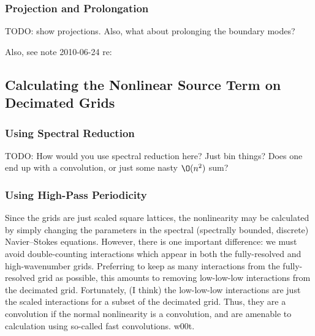\documentclass[10pt,showpacs,showkeys,%
amsfonts,amsmath,
onecolumn,
floatfix,aps,superscriptaddress]{revtex4}
\begin{document}
\subsubsection{Projection and Prolongation}
TODO: show projections.  Also, what about prolonging the boundary modes?

Also, see note 2010-06-24 re: 

\subsection{Calculating the Nonlinear Source Term on Decimated Grids}

\subsubsection{Using Spectral Reduction}

TODO: How would you use spectral reduction here?  Just bin things?
Does one end up with a convolution, or just some nasty $\O(n^2)$ sum?

\subsubsection{Using High-Pass Periodicity}

Since the grids are just scaled square lattices, the nonlinearity may
be calculated by simply changing the parameters in the spectral
(spectrally bounded, discrete) Navier--Stokes equations.  However,
there is one important difference: we must avoid double-counting
interactions which appear in both the fully-resolved and
high-wavenumber grids.  Preferring to keep as many interactions from
the fully-resolved grid as possible, this amounts to removing
low-low-low interactions from the decimated grid.  Fortunately, (I
think) the low-low-low interactions are just the scaled interactions
for a subset of the decimated grid.  Thus, they are a convolution if
the normal nonlinearity is a convolution, and are amenable to
calculation using so-called fast convolutions.  w00t.
\end{document}
